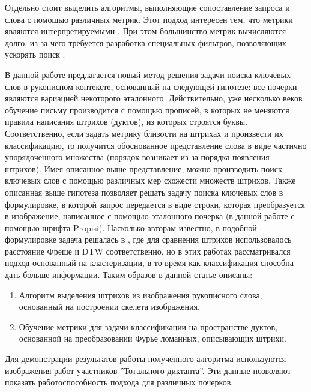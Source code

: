 \documentclass{article}
\begin{document}
\par Отдельно стоит выделить алгоритмы, выполняющие сопоставление запроса и слова с помощью различных метрик. Этот подход интересен тем, что метрики являются интерпретируемыми \citep{ameri2017keyword, stauffer2016graph}. При этом большинство метрик вычисляются долго, из-за чего требуется разработка специальных фильтров, позволяющих ускорять поиск \citep{stauffer2020filters}.
\par В данной работе предлагается новый метод решения задачи поиска ключевых слов в рукописном контексте, основанный на следующей гипотезе: все почерки являются вариацией некоторого эталонного. Действительно, уже несколько веков обучение письму производится с помощью прописей, в которых не меняются правила написания штрихов (дуктов), из которых строятся буквы. Соответственно, если задать метрику близости на штрихах и произвести их классификацию, то получится обоснованное представление слова в виде частично упорядоченного множества (порядок возникает из-за порядка появления штрихов). Имея описанное выше представление, можно производить поиск ключевых слов с помощью различных мер схожести множеств штрихов. Также описанная выше гипотеза позволяет решать задачу поиска ключевых слов в формулировке, в которой запрос передается в виде строки, которая преобразуется в изображение, написанное с помощью эталонного почерка (в данной работе с помощью шрифта Propisi). Насколько авторам известно, в подобной формулировке задача решалась в \citep{pronina2023frechet, pazazia2023dtw}, где для сравнения штрихов использовалось расстояние Фреше и DTW соответственно, но в этих работах рассматривался подход основанный на кластеризации, в то время как классификация способна дать больше информации. Таким образов в данной статье описаны:
\begin{enumerate}
\item Алгоритм выделения штрихов из изображения рукописного слова, основанный на построении скелета изображения.
\item Обучение метрики для задачи классификации на пространстве дуктов, основанной на преобразовании Фурье ломанных, описывающих штрихи.
\end{enumerate}
Для демонстрации результатов работы полученного алгоритма используются изображения работ участников ''Тотального диктанта''. Эти данные позволяют показать работоспособность подхода для различных почерков.
\end{document}

